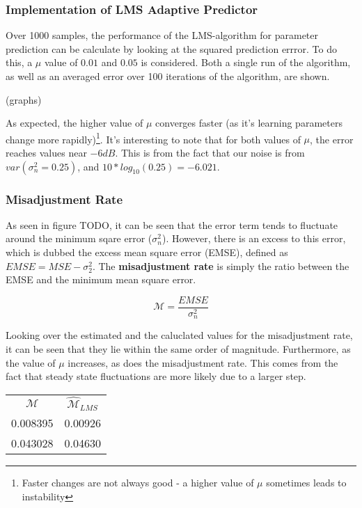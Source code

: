 \documentclass[main.tex]{subfiles}
\begin{document}
\subsubsection{Implementation of LMS Adaptive Predictor}

Over 1000 samples, the performance of the LMS-algorithm for parameter prediction can be calculate by looking at the squared prediction errror. To do this, a $\mu$ value of $0.01$ and $0.05$ is considered. Both a single run of the algorithm, as well as an averaged error over 100 iterations of the algorithm, are shown.

(graphs)

As expected, the higher value of $\mu$ converges faster (as it's learning parameters change more rapidly)\footnote{Faster changes are not always good - a higher value of $\mu$ sometimes leads to instability}. It's interesting to note that for both values of $\mu$, the error reaches values near $-6dB$. This is from the fact that our noise is from $var(\sigma_n^2 = 0.25)$, and $10*log_{10}(0.25) = -6.021$.


\subsubsection{Misadjustment Rate}


As seen in figure TODO, it can be seen that the error term tends to fluctuate around the minimum sqare error ($\sigma_n^2$). However, there is an excess to this error, which is dubbed the excess mean square error (EMSE), defined as $EMSE = MSE - \sigma_2^2$. The \textbf{misadjustment rate} is simply the ratio between the EMSE and the minimum mean square error.

\begin{equation*}
\mathcal{M} = \frac{EMSE}{\sigma_n^2}
\end{equation*}

Looking over the estimated and the caluclated values for the misadjustment rate, it can be seen that they lie within the same order of magnitude. Furthermore, as the value of $\mu$ increases, as does the misadjustment rate. This comes from the fact that steady state fluctuations are more likely due to a larger step.

\begin{table}[h]
	\centering
	\begin{tabular}{c c}
		$\mathcal{M}$ & $\hat{\mathcal{M}}_{LMS} $ \\
		0.008395      & 0.00926                   \\
		0.043028      & 0.04630                  
	\end{tabular}
\end{table}
\end{document}
